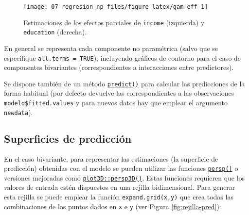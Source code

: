 \documentclass[
]{book}
\theoremstyle{break}
\theoremstyle{nonumberplain}
\begin{document}
\begin{figure}[!htb]

{\centering \texttt{[image: 07-regresion\_np\_files/figure-latex/gam-eff-1]} 

}

\caption{Estimaciones de los efectos parciales de \texttt{income} (izquierda) y \texttt{education} (derecha).}\label{fig:gam-eff}
\end{figure}

En general se representa cada componente no paramétrica (salvo que se especifique \texttt{all.terms\ =\ TRUE}), incluyendo gráficos de contorno para el caso de componentes bivariantes (correspondientes a interacciones entre predictores).

Se dispone también de un método \href{https://rdrr.io/pkg/mgcv/man/predict.gam.html}{\texttt{predict()}} para calcular las predicciones de la forma habitual (por defecto devuelve las correspondientes a las observaciones \texttt{modelo\$fitted.values} y para nuevos datos hay que emplear el argumento \texttt{newdata}).

\hypertarget{superficies-de-predicciuxf3n}{%
\subsection{Superficies de predicción}\label{superficies-de-predicciuxf3n}}

En el caso bivariante, para representar las estimaciones (la superficie de predicción) obtenidas con el modelo se pueden utilizar las funciones \href{https://rdrr.io/r/graphics/persp.html}{\texttt{persp()}} o versiones mejoradas como \href{https://rdrr.io/pkg/plot3D/man/persp3D.html}{\texttt{plot3D::persp3D()}}.
Estas funciones requieren que los valores de entrada estén dispuestos en una rejilla bidimensional.
Para generar esta rejilla se puede emplear la función \texttt{expand.grid(x,y)} que crea todas las combinaciones de los puntos dados en \texttt{x} e \texttt{y} (ver Figura \ref{fig:rejilla-pred}):
\end{document}
